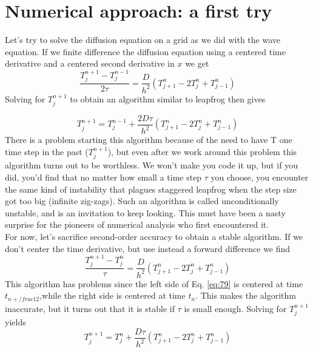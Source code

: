 \section*{Numerical approach: a first try}

Let\rq s try to solve the diffusion equation on a grid as we did with the wave equation.
If we finite difference the diffusion equation using a centered time derivative and
a centered second derivative in $x$ we get
\begin{equation}\label{eq:77}
\frac{T_{j}^{n+1}-T_{j}^{n-1}}{2 \tau}=\frac{D}{h^{2}}\left(T_{j+1}^{n}-2 T_{j}^{n}+T_{j-1}^{n}\right)
\end{equation}
Solving for $T_j^{n+1}$ to obtain an algorithm similar to leapfrog then gives

\begin{equation}\label{eq:78}
T_{j}^{n+1}=T_{j}^{n-1}+\frac{2 D \tau}{h^{2}}\left(T_{j+1}^{n}-2 T_{j}^{n}+T_{j-1}^{n}\right)
\end{equation}
There is a problem starting this algorithm because of the need to have T one time
step in the past ($T_j^{n+1}$), but even after we work around this problem this algorithm
turns out to be worthless. We won\rq t make you code it up, but if you did, you\rq d
find that no matter how small a time step $\tau$ you choose, you encounter the same
kind of instability that plagues staggered leapfrog when the step size got too big
(infinite zig-zags). Such an algorithm is called unconditionally unstable, and is an
invitation to keep looking. This must have been a nasty surprise for the pioneers
of numerical analysis who first encountered it. \\ 
For now, let\rq s sacrifice second-order accuracy to obtain a stable algorithm. If
we don\rq t center the time derivative, but use instead a forward difference we find
\begin{equation}\label{eq:79}
\frac{T_{j}^{n+1}-T_{j}^{n}}{\tau}=\frac{D}{h^{2}}\left(T_{j+1}^{n}-2 T_{j}^{n}+T_{j-1}^{n}\right)
\end{equation}
This algorithm has problems since the left side of Eq. \eqref{eq:79} is centered at time $t_{n+/frac{1}{2}}$,while the right side is centered at time $t_n$. This makes the algorithm inaccurate, but it turns out that it is stable if $\tau$ is small enough. Solving for $T_j^{n+1}$ yields
\begin{equation}\label{eq:710}
T_{j}^{n+1}=T_{j}^{n}+\frac{D \tau}{h^{2}}\left(T_{j+1}^{n}-2 T_{j}^{n}+T_{j-1}^{n}\right)
\end{equation}
